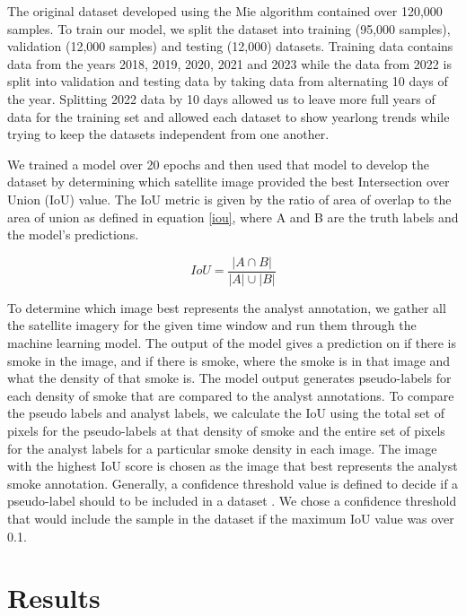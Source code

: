 \documentclass{article}
\begin{document}
The original dataset developed using the Mie algorithm contained over 120,000 samples. To train our model, we split the dataset into training (95,000 samples), validation (12,000 samples) and testing (12,000) datasets. Training data contains data from the years 2018, 2019, 2020, 2021 and 2023 while the data from 2022 is split into validation and testing data by taking data from alternating 10 days of the year. Splitting 2022 data by 10 days allowed us to leave more full years of data for the training set and allowed each dataset to show yearlong trends while trying to keep the datasets independent from one another.

We trained a model over 20 epochs and then used that model to develop the dataset by determining which satellite image provided the best Intersection over Union (IoU) value. The IoU metric is given by the ratio of area of overlap to the area of union as defined in equation \ref{iou}, where A and B are the truth labels and the model's predictions.

\begin{equation} \label{iou}
    IoU = \frac{| A \cap B|}{|A|\cup|B|}
\end{equation}

To determine which image best represents the analyst annotation, we gather all the satellite imagery for the given time window and run them through the machine learning model. The output of the model gives a prediction on if there is smoke in the image, and if there is smoke, where the smoke is in that image and what the density of that smoke is. The model output generates pseudo-labels for each density of smoke that are compared to the analyst annotations. To compare the pseudo labels and analyst labels, we calculate the IoU using the total set of pixels for the pseudo-labels at that density of smoke and the entire set of pixels for the analyst labels for a particular smoke density in each image. The image with the highest IoU score is chosen as the image that best represents the analyst smoke annotation. Generally, a confidence threshold value is defined to decide if a pseudo-label should to be included in a dataset \citep{conf_thresh}. We chose a confidence threshold that would include the sample in the dataset if the maximum IoU value was over 0.1.



\section*{Results}
\end{document}
